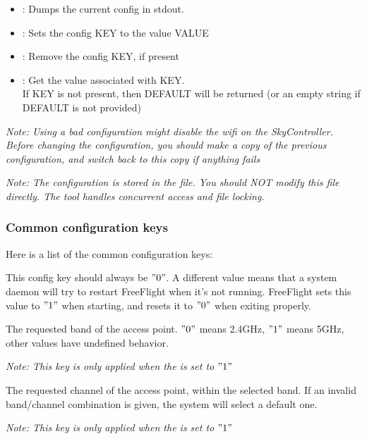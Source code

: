 \begin{itemize}
\item {} : Dumps the current config in stdout.
\item {} : Sets the config KEY to the value VALUE
\item {} : Remove the config KEY, if present
\item {} : Get the value associated with KEY. \\
If KEY is not present, then DEFAULT will be returned (or an empty string if DEFAULT is not provided)
\end{itemize}

\emph{Note: Using a bad configuration might disable the wifi on the SkyController. Before changing the configuration, you should make a copy of the previous configuration, and switch back to this copy if anything fails}

\emph{Note: The configuration is stored in the  file. You should NOT modify this file directly. The  tool handles concurrent access and file locking.}

\subsubsection{Common configuration keys}

Here is a list of the common configuration keys:


This config key should always be $"0"$. A different value means that a system daemon will try to restart FreeFlight when it's not running. FreeFlight sets this value to $"1"$ when starting, and resets it to $"0"$ when exiting properly.


The requested band of the access point. $"0"$ means 2.4GHz, $"1"$ means 5GHz, other values have undefined behavior.

\emph{Note: This key is only applied when the  is set to $"1"$}


The requested channel of the access point, within the selected band. If an invalid band/channel combination is given, the system will select a default one.

\emph{Note: This key is only applied when the  is set to $"1"$}

